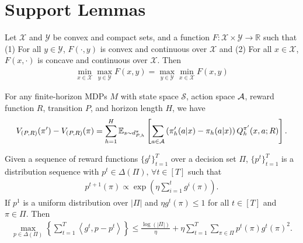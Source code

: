 \section{Support Lemmas}

\begin{lemma}
Let $\mathcal{X}$ and $\mathcal{Y}$ be convex and compact sets, and a function $F: \mathcal{X} \times \mathcal{Y} \rightarrow \mathbb{R}$ such that (1) For all $y \in \mathcal{Y}$, $F(\cdot, y)$ is convex and continuous over $\mathcal{X}$ and (2) For all $x \in \mathcal{X}$, $F(x, \cdot)$ is concave and continuous over $\mathcal{X}$. Then 
\begin{align*}
    \min_{x \in \mathcal{X}}\max_{y \in  \mathcal{Y}} F(x,y) =  \max_{y \in  \mathcal{Y}}\min_{x \in \mathcal{X}} F(x,y) 
\end{align*}
\label{lem:minmax}
\end{lemma}


\begin{lemma}
For any finite-horizon MDPs $M$ with state space $\mathcal{S}$, action space $\mathcal{A}$, reward function $R$, transition $P$, and horizon length $H$, we have
\begin{align*}
    V_{(P, R)}(\pi') - V_{(P,R)}(\pi) = \sum_{h=1}^H \mathbb{E}_{s \sim d_{P,h}^\pi} \left[\sum_{a \in \mathcal{A}} \left(\pi_h'(a|x) - \pi_h(a|x)\right) Q^{\pi'}_h(x,a; R)\right].
\end{align*}   
\label{lem:PDL}
\end{lemma}


\begin{lemma}
Given a sequence of reward functions $\{g^t\}_{t=1}^T$ over a decision set $\Pi$,  $\{p^t\}_{t=1}^T$ is a distribution sequence with $p^t \in \Delta\left(\Pi\right), \,\forall t \in [T]$ such that 
\begin{align*}
    p^{t+1}(\pi) \propto \exp\left(\eta \sum_{i=1}^t g^i(\pi)\right).
\end{align*}
If $p^1$ is a uniform distribution over $|\Pi|$ and $\eta g^{t}(\pi) \leq 1$ for all $t \in [T]$ and $\pi \in \Pi$. Then
\begin{align*}
    \max_{p \in \Delta(\Pi)}\left\{\sum_{t=1}^T \left\langle g^t,  p - p^t\right\rangle \right\} \le \frac{\log(|\Pi|)}{\eta} + \eta\sum_{t=1}^T\sum_{\pi \in \Pi} p^t(\pi) g^t(\pi)^2.
\end{align*}
\label{lem:EXP}
\end{lemma}



